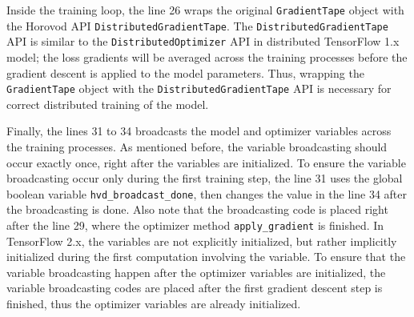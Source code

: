 Inside the training loop,
the line 26 wraps the original {\tt GradientTape} object with the Horovod API  
{\tt DistributedGradientTape}.
The {\tt DistributedGradientTape} API is similar
to the {\tt DistributedOptimizer} API in distributed TensorFlow 1.x model; 
the loss gradients will be averaged across the training processes 
before the gradient descent is applied to the model parameters.
Thus, wrapping the {\tt GradientTape} object with the 
{\tt DistributedGradientTape} API is necessary for correct distributed training
of the model.

Finally, the lines 31 to 34 broadcasts the model and optimizer variables
across the training processes.
As mentioned before, the variable broadcasting should occur exactly once,
right after the variables are initialized.
To ensure the variable broadcasting occur only during the first training step,
the line 31 uses the global boolean variable {\tt hvd\_broadcast\_done},
then changes the value in the line 34 after the broadcasting is done.
Also note that the broadcasting code is placed right after the line 29,
where the optimizer method {\tt apply\_gradient} is finished.
In TensorFlow 2.x, the variables are not explicitly initialized,
but rather implicitly initialized during the first computation involving the
variable.
To ensure that the variable broadcasting happen after the optimizer
variables are initialized, the variable broadcasting codes are placed
after the first gradient descent step is finished, thus the optimizer
variables are already initialized.
